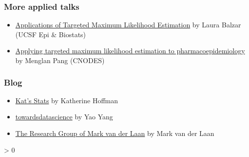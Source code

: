 \documentclass[
]{book}
\providecommand{\tightlist}{%
  \setlength{\itemsep}{0pt}\setlength{\parskip}{0pt}}
\newlength{\cslhangindent}
\newenvironment{CSLReferences}[2] %
 {%
  \setlength{\parindent}{0pt}
  \ifodd #1 \everypar{\setlength{\hangindent}{\cslhangindent}}\ignorespaces\fi
  \ifnum #2 > 0
  \setlength{\parskip}{#2\baselineskip}
  \fi
 }%
 {}
\begin{document}
\hypertarget{more-applied-talks}{%
\subsubsection{More applied talks}\label{more-applied-talks}}

\begin{itemize}
\tightlist
\item
  \href{https://www.youtube.com/watch?v=foY7HoCeo88}{Applications of Targeted Maximum Likelihood Estimation} by Laura Balzar (UCSF Epi \& Biostats)
\item
  \href{https://www.cnodes.ca/online-lecture/targeted-learning-estimation/}{Applying targeted maximum likelihood estimation to pharmacoepidemiology} by Menglan Pang (CNODES)
\end{itemize}

\hypertarget{blog}{%
\subsubsection{Blog}\label{blog}}

\begin{itemize}
\tightlist
\item
  \href{https://www.khstats.com/}{Kat's Stats} by Katherine Hoffman
\item
  \href{https://towardsdatascience.com/targeted-maximum-likelihood-tmle-for-causal-inference-1be88542a749}{towardsdatascience} by Yao Yang
\item
  \href{https://vanderlaan-lab.org/post/}{The Research Group of Mark van der Laan} by Mark van der Laan
\end{itemize}

\hypertarget{refs}{}
\begin{CSLReferences}{0}{0}
\end{CSLReferences}

  
\end{document}
